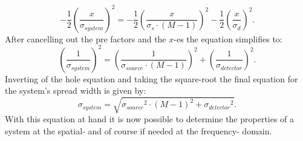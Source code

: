 \begin{equation}
-\frac{1}{2}\left(\frac{x}{\sigma_{system}}\right)^{2} = -\frac{1}{2}\left(\frac{x}{\sigma_{s}\cdot(M-1)}\right)^{2}-\frac{1}{2}\left(\frac{x}{\sigma_{d}}\right)^{2}.
\end{equation}
After cancelling out the pre factors and the $x$-es the equation simplifies to:
\begin{equation}
\left(\frac{1}{\sigma_{system}}\right)^{2} = \left(\frac{1}{\sigma_{source}\cdot(M-1)}\right)^{2}+\left(\frac{1}{\sigma_{detector}}\right)^{2}.
\end{equation}
Inverting of the hole equation and taking the square-root the final equation for the system's spread width is given by:
\begin{equation}\label{spotwidth}
 \sigma_{system} = \sqrt{{\sigma_{source}}^{2}\cdot(M-1)^{2}+{\sigma_{detector}}^{2}}.
\end{equation}
With this equation at hand it is now possible to determine the properties of a system at the spatial- and of course if needed at the frequency- domain.









